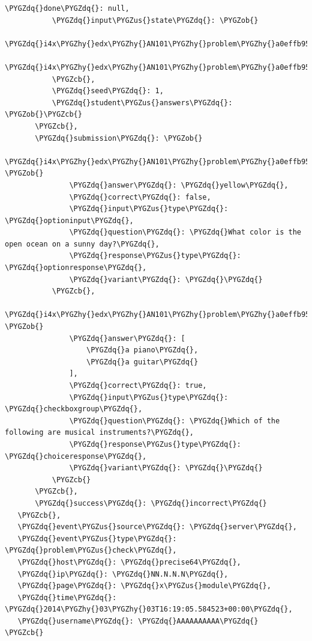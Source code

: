 \documentclass[a4paper,12pt,oneside]{sphinxmanual}
\def\PYGZus{\char`\_}
\def\PYGZob{\char`\{}
\def\PYGZcb{\char`\}}
\def\PYGZhy{\char`\-}
\def\PYGZdq{\char`\"}
\begin{document}
\begin{Verbatim}[commandchars=\\\{\}]
           \PYGZdq{}done\PYGZdq{}: null,
           \PYGZdq{}input\PYGZus{}state\PYGZdq{}: \PYGZob{}
               \PYGZdq{}i4x\PYGZhy{}edx\PYGZhy{}AN101\PYGZhy{}problem\PYGZhy{}a0effb954cca4759994f1ac9e9434bf4\PYGZus{}2\PYGZus{}1\PYGZdq{}:\PYGZob{}\PYGZcb{},
               \PYGZdq{}i4x\PYGZhy{}edx\PYGZhy{}AN101\PYGZhy{}problem\PYGZhy{}a0effb954cca4759994f1ac9e9434bf4\PYGZus{}4\PYGZus{}1\PYGZdq{}:\PYGZob{}\PYGZcb{}
           \PYGZcb{},
           \PYGZdq{}seed\PYGZdq{}: 1,
           \PYGZdq{}student\PYGZus{}answers\PYGZdq{}: \PYGZob{}\PYGZcb{}
       \PYGZcb{},
       \PYGZdq{}submission\PYGZdq{}: \PYGZob{}
           \PYGZdq{}i4x\PYGZhy{}edx\PYGZhy{}AN101\PYGZhy{}problem\PYGZhy{}a0effb954cca4759994f1ac9e9434bf4\PYGZus{}2\PYGZus{}1\PYGZdq{}: \PYGZob{}
               \PYGZdq{}answer\PYGZdq{}: \PYGZdq{}yellow\PYGZdq{},
               \PYGZdq{}correct\PYGZdq{}: false,
               \PYGZdq{}input\PYGZus{}type\PYGZdq{}: \PYGZdq{}optioninput\PYGZdq{},
               \PYGZdq{}question\PYGZdq{}: \PYGZdq{}What color is the open ocean on a sunny day?\PYGZdq{},
               \PYGZdq{}response\PYGZus{}type\PYGZdq{}: \PYGZdq{}optionresponse\PYGZdq{},
               \PYGZdq{}variant\PYGZdq{}: \PYGZdq{}\PYGZdq{}
           \PYGZcb{},
           \PYGZdq{}i4x\PYGZhy{}edx\PYGZhy{}AN101\PYGZhy{}problem\PYGZhy{}a0effb954cca4759994f1ac9e9434bf4\PYGZus{}4\PYGZus{}1\PYGZdq{}: \PYGZob{}
               \PYGZdq{}answer\PYGZdq{}: [
                   \PYGZdq{}a piano\PYGZdq{},
                   \PYGZdq{}a guitar\PYGZdq{}
               ],
               \PYGZdq{}correct\PYGZdq{}: true,
               \PYGZdq{}input\PYGZus{}type\PYGZdq{}: \PYGZdq{}checkboxgroup\PYGZdq{},
               \PYGZdq{}question\PYGZdq{}: \PYGZdq{}Which of the following are musical instruments?\PYGZdq{},
               \PYGZdq{}response\PYGZus{}type\PYGZdq{}: \PYGZdq{}choiceresponse\PYGZdq{},
               \PYGZdq{}variant\PYGZdq{}: \PYGZdq{}\PYGZdq{}
           \PYGZcb{}
       \PYGZcb{},
       \PYGZdq{}success\PYGZdq{}: \PYGZdq{}incorrect\PYGZdq{}
   \PYGZcb{},
   \PYGZdq{}event\PYGZus{}source\PYGZdq{}: \PYGZdq{}server\PYGZdq{},
   \PYGZdq{}event\PYGZus{}type\PYGZdq{}: \PYGZdq{}problem\PYGZus{}check\PYGZdq{},
   \PYGZdq{}host\PYGZdq{}: \PYGZdq{}precise64\PYGZdq{},
   \PYGZdq{}ip\PYGZdq{}: \PYGZdq{}NN.N.N.N\PYGZdq{},
   \PYGZdq{}page\PYGZdq{}: \PYGZdq{}x\PYGZus{}module\PYGZdq{},
   \PYGZdq{}time\PYGZdq{}: \PYGZdq{}2014\PYGZhy{}03\PYGZhy{}03T16:19:05.584523+00:00\PYGZdq{},
   \PYGZdq{}username\PYGZdq{}: \PYGZdq{}AAAAAAAAAA\PYGZdq{}
\PYGZcb{}
\end{Verbatim}
\end{document}
